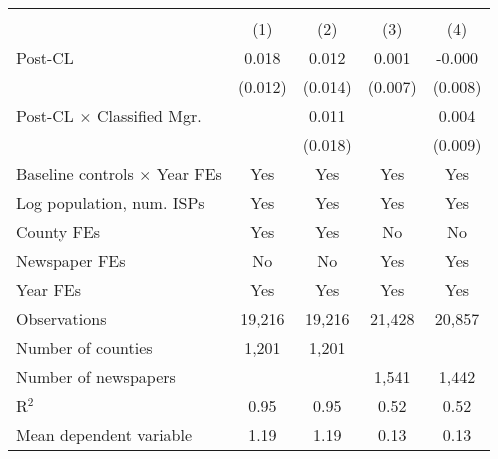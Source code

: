 {
\def\sym#1{\ifmmode^{#1}\else\(^{#1}\)\fi}
\begin{tabular}{l*{4}{c}}
\toprule
                    &&\\\cmidrule(lr){2-3}\cmidrule(lr){4-5}
                    &         &         &         &         \\
\midrule
Post-CL             &       0.018         &       0.012         &       0.001         &      -0.000         \\
                    &     (0.012)         &     (0.014)         &     (0.007)         &     (0.008)         \\
\addlinespace
Post-CL $\times$ Classified Mgr.&                     &       0.011         &                     &       0.004         \\
                    &                     &     (0.018)         &                     &     (0.009)         \\
\addlinespace
Baseline controls $\times$ Year FEs &         Yes         &         Yes         &         Yes         &         Yes         \\
\addlinespace
Log population, num. ISPs &         Yes         &         Yes         &         Yes         &         Yes         \\
\addlinespace
County FEs          &         Yes         &         Yes         &          No         &          No         \\
\addlinespace
Newspaper FEs       &          No         &          No         &         Yes         &         Yes         \\
\addlinespace
Year FEs            &         Yes         &         Yes         &         Yes         &         Yes         \\
\midrule
Observations        &      19,216         &      19,216         &      21,428         &      20,857         \\
Number of counties  &       1,201         &       1,201         &                     &                     \\
Number of newspapers&                     &                     &       1,541         &       1,442         \\
R$^2$               &        0.95         &        0.95         &        0.52         &        0.52         \\
Mean dependent variable&        1.19         &        1.19         &        0.13         &        0.13         \\
\bottomrule
\end{tabular}
}
